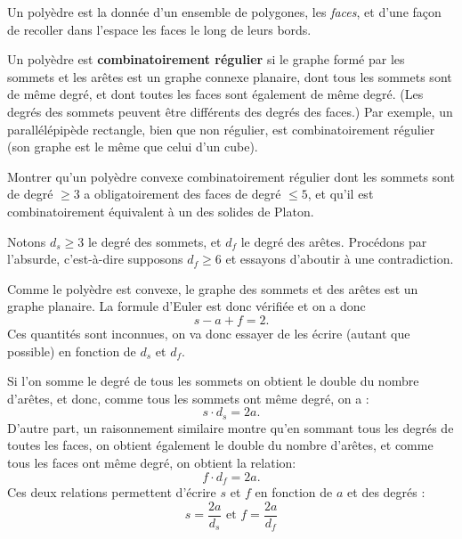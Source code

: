 \begin{exo}

Un polyèdre est la donnée d'un ensemble de polygones, les \emph{faces}, et d'une façon de recoller dans l'espace les faces le long de leurs bords.


Un polyèdre est \textbf{combinatoirement régulier} si le graphe formé par les sommets et les arêtes est un graphe connexe planaire, dont tous les sommets sont de même degré, et dont toutes les faces sont également de même degré. (Les degrés des sommets peuvent être différents des degrés des faces.) Par exemple, un parallélépipède rectangle, bien que non régulier, est combinatoirement régulier (son graphe est le même que celui d'un cube).




Montrer qu'un polyèdre convexe combinatoirement régulier dont les sommets sont de degré $\geq 3$ a obligatoirement des  faces de degré $\leq 5$, et qu'il est combinatoirement équivalent à un des solides de Platon. 

\begin{sol}

Notons $d_s\geq 3$ le degré des sommets, et $d_f$ le degré des arêtes. Procédons par l'absurde, c'est-à-dire supposons $d_f\geq 6$ et essayons d'aboutir à une contradiction.


Comme le polyèdre est convexe, le graphe des sommets et des arêtes est un graphe planaire. La formule d'Euler est donc vérifiée et on a donc 
\[s-a+f=2.\]
Ces quantités sont inconnues, on va donc essayer de les écrire (autant que possible) en fonction de $d_s$ et $d_f$.

Si l'on somme le degré de tous les sommets on obtient le double du nombre d'arêtes, et donc, comme tous les sommets ont même degré, on a :
\[ s\cdot d_s = 2a.\]
D'autre part,  un raisonnement similaire montre qu'en sommant tous les degrés de toutes les faces, on obtient également le double du nombre d'arêtes, et comme tous les faces ont même degré, on obtient la relation:
\[
f\cdot d_f = 2a.
\]
Ces deux relations permettent d'écrire $s$ et $f$ en fonction de $a$ et des degrés : 
\[ s = \frac{2a}{d_s}\text{ et } f = \frac{2a}{d_f} \]


\end{sol}
\end{exo}
